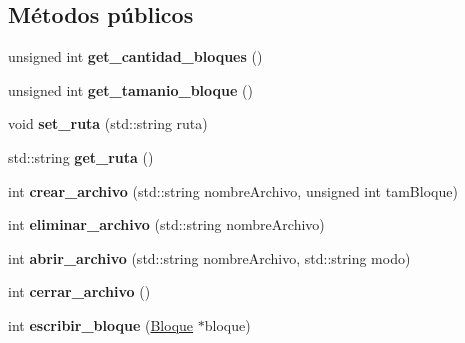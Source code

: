 \subsection*{\-Métodos públicos}
\begin{DoxyCompactItemize}
\item 
\hypertarget{class_manejador_bloques_a7c8cb3eb19ff48f0865e496720e908ac}{unsigned int {\bfseries get\-\_\-cantidad\-\_\-bloques} ()}\label{class_manejador_bloques_a7c8cb3eb19ff48f0865e496720e908ac}

\item 
\hypertarget{class_manejador_bloques_a4271e9b3f1ae6f01d8ee46d1e45ec891}{unsigned int {\bfseries get\-\_\-tamanio\-\_\-bloque} ()}\label{class_manejador_bloques_a4271e9b3f1ae6f01d8ee46d1e45ec891}

\item 
\hypertarget{class_manejador_bloques_af83acb36cc28fbca042f20fbb0caadbc}{void {\bfseries set\-\_\-ruta} (std\-::string ruta)}\label{class_manejador_bloques_af83acb36cc28fbca042f20fbb0caadbc}

\item 
\hypertarget{class_manejador_bloques_a35f4946638098db6f89ab249991fcc42}{std\-::string {\bfseries get\-\_\-ruta} ()}\label{class_manejador_bloques_a35f4946638098db6f89ab249991fcc42}

\item 
\hypertarget{class_manejador_bloques_a036f39afc8118779e046320b3d0f5337}{int {\bfseries crear\-\_\-archivo} (std\-::string nombre\-Archivo, unsigned int tam\-Bloque)}\label{class_manejador_bloques_a036f39afc8118779e046320b3d0f5337}

\item 
\hypertarget{class_manejador_bloques_a6ea571d73a60c05d303ee399aa0dbf37}{int {\bfseries eliminar\-\_\-archivo} (std\-::string nombre\-Archivo)}\label{class_manejador_bloques_a6ea571d73a60c05d303ee399aa0dbf37}

\item 
\hypertarget{class_manejador_bloques_ae9a81ec71d2337ca610f1d32e6002eeb}{int {\bfseries abrir\-\_\-archivo} (std\-::string nombre\-Archivo, std\-::string modo)}\label{class_manejador_bloques_ae9a81ec71d2337ca610f1d32e6002eeb}

\item 
\hypertarget{class_manejador_bloques_a3025a5d0efb63e5a5519f06c0cef5519}{int {\bfseries cerrar\-\_\-archivo} ()}\label{class_manejador_bloques_a3025a5d0efb63e5a5519f06c0cef5519}

\item 
\hypertarget{class_manejador_bloques_a7c6192df0d3ad2b76413ff952434c59a}{int {\bfseries escribir\-\_\-bloque} (\hyperlink{class_bloque}{\-Bloque} $\ast$bloque)}\label{class_manejador_bloques_a7c6192df0d3ad2b76413ff952434c59a}


\end{DoxyCompactItemize}
